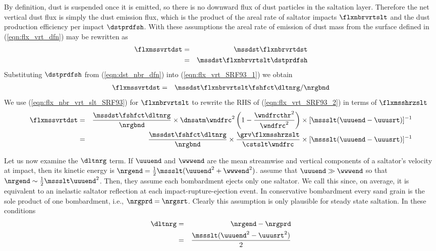 \documentclass[12pt,twoside]{book}
\begin{document}
By definition, dust is suspended once it is emitted, so there is no
downward flux of dust particles in the saltation layer.
Therefore the net vertical dust flux is simply the dust emission flux, 
which is the product of the areal rate of saltator impacts
$\flxnbrvrtslt$ and the dust production efficiency per impact
$\dstprdfsh$. 
With these assumptions the areal rate of emission of dust mass from
the surface defined in (\ref{eqn:flx_vrt_dfn}) may be rewritten as  
\begin{eqnarray}
\flxmssvrtdst & = & \mssdst \flxnbrvrtdst \\
& = & \mssdst \flxnbrvrtslt \dstprdfsh
\label{eqn:flx_vrt_SRF93_1}
\end{eqnarray}
Substituting $\dstprdfsh$ from (\ref{eqn:dst_nbr_dfn}) into
(\ref{eqn:flx_vrt_SRF93_1}) we obtain
\begin{eqnarray}
\flxmssvrtdst & = & \mssdst \flxnbrvrtslt \fshfct \dltnrg / \nrgbnd
\label{eqn:flx_vrt_SRF93_2}
\end{eqnarray}
We use (\ref{eqn:flx_nbr_vrt_slt_SRF93}) for $\flxnbrvrtslt$ to
rewrite the RHS of (\ref{eqn:flx_vrt_SRF93_2}) in terms of $\flxmsshrzslt$  
\begin{eqnarray}
\flxmssvrtdst 
& = & \frac{\mssdst \fshfct \dltnrg}{\nrgbnd } \times
\dnsatm \wndfrc^{2} \left( 1 - \frac{\wndfrcthr^{2}}{\wndfrc^{2} } \right) \times
[ \mssslt ( \uuuend - \uuusrt ) ]^{-1} \nonumber \\
& = & 
\frac{\mssdst \fshfct \dltnrg}{\nrgbnd } \times
\frac{\grv \flxmsshrzslt}{\cstslt \wndfrc } \times
[ \mssslt ( \uuuend - \uuusrt ) ]^{-1}
\label{eqn:flx_vrt_SRF93_3}
\end{eqnarray}

Let us now examine the $\dltnrg$ term.
If $\uuuend$ and $\wwwend$ are the mean streamwise and vertical
components of a saltator's velocity at impact, then its kinetic energy
is $\nrgend = \frac{1}{2} \mssslt ( \uuuend^{2} + \wwwend^{2} )$.
\cite{SRF93} assume that $\uuuend \gg \wwwend$ so that 
$\nrgend \sim \frac{1}{2} \mssslt \uuuend^{2}$.
Then, they assume each bombardment ejects only one saltator.
We call this  since, on average,
it is equivalent to an inelastic saltator reflection at each
impact-rupture-ejection event. 
In conservative bombardment every sand grain is the sole product of
one bombardment, i.e., $\nrgprd = \nrgsrt$.
Clearly this assumption is only plausible for steady state saltation.
In these conditions
\begin{eqnarray}
\dltnrg & = & \nrgend - \nrgprd \nonumber \\
& = & \frac{\mssslt ( \uuuend^{2} - \uuusrt^{2} )}{2}
\label{eqn:dlt_nrg_cns_bmb}
\end{eqnarray}
\end{document}

